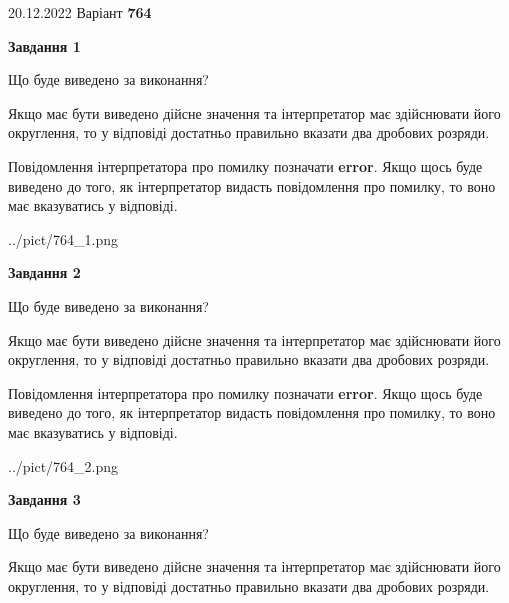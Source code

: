 \documentclass[12pt, ukrainian]{article}
\begin{document}
{20.12.2022 Варіант \No \textbf { 764 }\par}
{
\begin {Large}

{\begin {center}\textbf{Завдання 1}\end {center}}\par
Що буде виведено за виконання? \par

Якщо має бути виведено дійсне значення та інтерпретатор має здійснювати його округлення, 
то у відповіді достатньо правильно вказати два дробових розряди.

Повідомлення інтерпретатора про помилку позначати \textbf{error}.
Якщо щось буде виведено до того, як інтерпретатор видасть повідомлення про помилку, 
то воно має вказуватись у відповіді. \par

\begin{center}
	{../pict/764_1.png}
\end{center}
\newpage

{\begin {center}\textbf{Завдання 2}\end {center}}\par
Що буде виведено за виконання? \par

Якщо має бути виведено дійсне значення та інтерпретатор має здійснювати його округлення, 
то у відповіді достатньо правильно вказати два дробових розряди.

Повідомлення інтерпретатора про помилку позначати \textbf{error}.
Якщо щось буде виведено до того, як інтерпретатор видасть повідомлення про помилку, 
то воно має вказуватись у відповіді. \par

\begin{center}
	{../pict/764_2.png}
\end{center}
\newpage

{\begin {center}\textbf{Завдання 3}\end {center}}\par
Що буде виведено за виконання? \par

Якщо має бути виведено дійсне значення та інтерпретатор має здійснювати його округлення, 
то у відповіді достатньо правильно вказати два дробових розряди.


\end{Large}}
\end{document}
